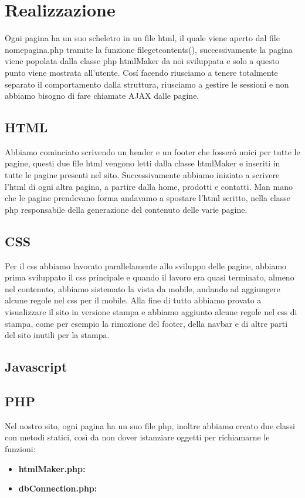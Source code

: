 \section{Realizzazione}
Ogni pagina ha un suo scheletro in un file html, il quale viene aperto dal file nome\textunderscore pagina.php tramite la funzione file\textunderscore get\textunderscore contents(), successivamente la pagina viene popolata dalla classe php htmlMaker da noi sviluppata e solo a questo punto viene mostrata all'utente. 
Cosí facendo riusciamo a tenere totalmente separato il comportamento dalla struttura, riusciamo a gestire le sessioni e non abbiamo bisogno di fare chiamate AJAX dalle pagine.
\subsection{HTML}
Abbiamo cominciato scrivendo un header e un footer che fosseró unici per tutte le pagine, questi due file html vengono letti dalla classe htmlMaker e inseriti in tutte le pagine presenti nel sito. Successivamente abbiamo iniziato a scrivere l'html di ogni altra pagina, a partire dalla home, prodotti e contatti. Man mano che le pagine prendevano forma andavamo a spostare l'html scritto, nella classe php responsabile della generazione del contenuto delle varie pagine.
\subsection{CSS}
Per il css abbiamo lavorato parallelamente allo sviluppo delle pagine, abbiamo prima sviluppato il css principale e quando il lavoro era quasi terminato, almeno nel contenuto, abbiamo sistemato la vista da mobile, andando ad aggiungere alcune regole nel css per il mobile. Alla fine di tutto abbiamo provato a visualizzare il sito in versione stampa e abbiamo aggiunto alcune regole nel css di stampa, come per esempio la rimozione del footer, della navbar e di altre parti del sito inutili per la stampa.
\subsection{Javascript}
\subsection{PHP}
Nel nostro sito, ogni pagina ha un suo file php, inoltre abbiamo creato due classi con metodi statici, così da non dover istanziare oggetti per richiamarne le funzioni:
\begin{itemize}
\item \textbf{htmlMaker.php:}
\item \textbf{dbConnection.php:}
\end{itemize}